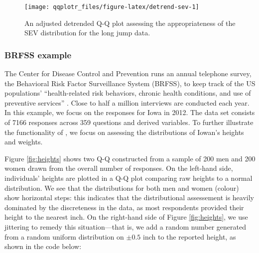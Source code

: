 \begin{Schunk}
\begin{figure}

{\centering \texttt{[image: qqplotr\_files/figure-latex/detrend-sev-1]} 

}

\caption[An adjusted detrended Q-Q plot assessing the appropriateness of the SEV distribution for the long jump data]{An adjusted detrended Q-Q plot assessing the appropriateness of the SEV distribution for the long jump data.}\label{fig:detrend-sev}
\end{figure}
\end{Schunk}

\subsubsection{BRFSS example}\label{brfss-example}

\label{sec:brfss}

The Center for Disease Control and Prevention runs an annual telephone
survey, the Behavioral Risk Factor Surveillance System (BRFSS), to keep
track of the US populations' ``health-related risk behaviors, chronic
health conditions, and use of preventive services'' \citep{brfss}. Close
to half a million interviews are conducted each year. In this example,
we focus on the responses for Iowa in 2012. The data set consists of
7166 responses across 359 questions and derived variables. To further
illustrate the functionality of , we focus on assessing the
distributions of Iowan's heights and weights.

Figure \ref{fig:heights} shows two Q-Q constructed from a sample of 200
men and 200 women drawn from the overall number of responses. On the
left-hand side, individuals' heights are plotted in a Q-Q plot comparing
raw heights to a normal distribution. We see that the distributions for
both men and women (colour) show horizontal steps: this indicates that
the distributional assessement is heavily dominated by the discreteness
in the data, as most respondents provided their height to the nearest
inch. On the right-hand side of Figure \ref{fig:heights}, we use
jittering to remedy this situation---that is, we add a random number
generated from a random uniform distribution on \(\pm 0.5\) inch to the
reported height, as shown in the code below:

